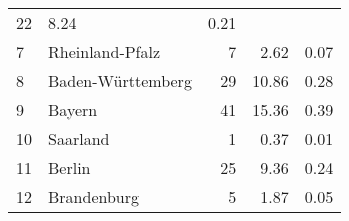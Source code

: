 \begin{longtable}{lXrrr}
       \num{22} &
       \num[round-mode=places,round-precision=2]{8.24} &
         \num[round-mode=places,round-precision=2]{0.21} \\

     7 &
     \multicolumn{1}{X}{ Rheinland-Pfalz   } &


       \num{7} &
       \num[round-mode=places,round-precision=2]{2.62} &
         \num[round-mode=places,round-precision=2]{0.07} \\

     8 &
     \multicolumn{1}{X}{ Baden-Württemberg   } &


       \num{29} &
       \num[round-mode=places,round-precision=2]{10.86} &
         \num[round-mode=places,round-precision=2]{0.28} \\

     9 &
     \multicolumn{1}{X}{ Bayern   } &


       \num{41} &
       \num[round-mode=places,round-precision=2]{15.36} &
         \num[round-mode=places,round-precision=2]{0.39} \\

     10 &
     \multicolumn{1}{X}{ Saarland   } &


       \num{1} &
       \num[round-mode=places,round-precision=2]{0.37} &
         \num[round-mode=places,round-precision=2]{0.01} \\

     11 &
     \multicolumn{1}{X}{ Berlin   } &


       \num{25} &
       \num[round-mode=places,round-precision=2]{9.36} &
         \num[round-mode=places,round-precision=2]{0.24} \\

     12 &
     \multicolumn{1}{X}{ Brandenburg   } &


       \num{5} &
       \num[round-mode=places,round-precision=2]{1.87} &
         \num[round-mode=places,round-precision=2]{0.05} \\


\end{longtable}
